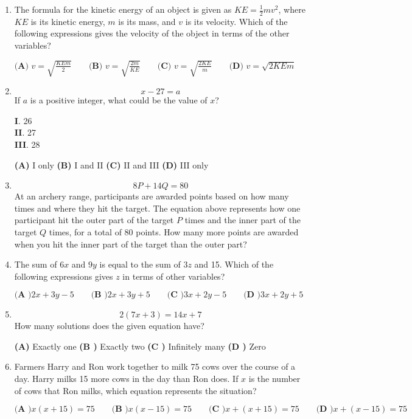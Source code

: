 \documentclass[../satmath.tex]{subfiles}
\begin{document}
\begin{enumerate}[label=\bfseries\arabic*.]
\item %
The formula for the kinetic energy of an object is given as $KE=\frac{1}{2}mv^2$, where $KE$ is its kinetic energy, $m$ is its mass, 
and $v$ is its velocity. Which of the following expressions gives the velocity of the object in terms of the other variables?

$\textbf{(A) } v=\sqrt{\frac{KEm}{2}} \qquad \textbf{(B) } v=\sqrt{\frac{2m}{KE}} \qquad \textbf{(C) } v=\sqrt{\frac{2KE}{m}} \qquad \textbf{(D) } v=\sqrt{2KEm}$

\item 
\[x-27=a\]
If $a$ is a positive integer, what could be the value of $x$?

\textbf{I}. 26\\
\textbf{II}. 27\\
\textbf{III}. 28

\textbf{(A) } I only \qquad \textbf{(B) } I and II \qquad \textbf{(C) } II and III \qquad \textbf{(D) } III only 

\item 
\[8P+14Q=80\]
At an archery range, participants are awarded points based on how many times and where they hit the target. The equation above represents how 
one participant hit the outer part of the target $P$ times and the inner part of the target $Q$ times, for a total of 80 points. How many more points are 
awarded when you hit the inner part of the target than the outer part?

\item 
The sum of $6x$ and $9y$ is equal to the sum of $3z$ and 15. Which of the following expressions gives $z$ in terms of other variables?

$\textbf{(A )} 2x+3y-5 \qquad \textbf{(B )} 2x+3y+5 \qquad \textbf{(C )} 3x+2y-5 \qquad \textbf{(D )} 3x+2y+5$

\item 
\[2(7x+3)=14x+7\]
How many solutions does the given equation have?

\textbf{(A) } Exactly one \qquad \textbf{(B )} Exactly two \qquad \textbf{(C )} Infinitely many \textbf{(D )} Zero

\item 
Farmers Harry and Ron work together to milk 75 cows over the course of a day. Harry milks 15 more cows in the day than Ron does.
If $x$ is the number of cows that Ron milks, which equation represents the situation?

$\textbf{(A )} x(x+15)=75 \qquad \textbf{(B )} x(x-15)=75 \qquad \textbf{(C )} x+(x+15) = 75 \qquad \textbf{(D )} x+(x-15) = 75$


\end{enumerate}
\end{document}
